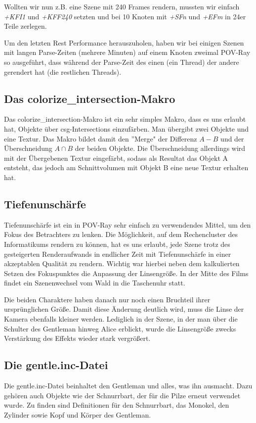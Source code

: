 \documentclass[twocolumn]{article}
\begin{document}
Wollten wir nun z.B. eine Szene mit 240 Frames rendern, mussten wir einfach \textit{+KFI1} und \textit{+KFF240} setzten und bei 10 Knoten mit \textit{+SFn} und \textit{+EFm} in 24er Teile zerlegen.
 

Um den letzten Rest Performance herauszuholen, haben wir bei einigen Szenen mit langen Parse-Zeiten (mehrere Minuten) auf einem Knoten zweimal POV-Ray so ausgeführt, dass während der Parse-Zeit des einen (ein Thread) der andere gerendert hat (die restlichen Threads).

\subsection{Das colorize\_intersection-Makro}
Das colorize\_intersection-Makro ist ein sehr simples Makro, dass es uns erlaubt hat, Objekte über csg-Intersections einzufärben.
Man übergibt zwei Objekte und eine Textur. Das Makro bildet damit den ''Merge" der Differenz $A - B$ und der Überschneidung $A \cap B$ der beiden Objekte.
Die Überschneidung allerdings wird mit der Übergebenen Textur eingefärbt, sodass als Resultat das Objekt A entsteht, das jedoch am Schnittvolumen mit Objekt B eine neue Textur erhalten hat.

\subsection{Tiefenunschärfe}
Tiefenunschärfe ist ein in POV-Ray sehr einfach zu verwendendes Mittel, um den Fokus des Betrachters zu lenken.
Die Möglichkeit, auf dem Rechencluster des Informatikums rendern zu können, hat es uns erlaubt, jede Szene trotz des gesteigerten Renderaufwands in endlicher Zeit mit Tiefenunschärfe in einer akzeptablen Qualität zu rendern.
Wichtig war hierbei neben dem kalkulierten Setzen des Fokuspunktes die Anpassung der Linsengröße.
In der Mitte des Films findet ein Szenenwechsel vom Wald in die Taschenuhr statt.

Die beiden Charaktere haben danach nur noch einen Bruchteil ihrer ursprünglichen Größe. Damit diese Änderung deutlich wird, muss die Linse der Kamera ebenfalls kleiner werden.
Lediglich in der Szene, in der man über die Schulter des Gentleman hinweg Alice erblickt, wurde die Linsengröße zwecks Verstärkung des Effekts wieder stark vergrößert.

\subsection{Die gentle.inc-Datei} %
Die gentle.inc-Datei beinhaltet den Gentleman und alles, was ihn ausmacht. Dazu gehören auch Objekte wie der Schnurrbart, der für die Pilze erneut verwendet wurde.
Zu finden sind Definitionen für den Schnurrbart, das Monokel, den Zylinder sowie Kopf und Körper des Gentleman.
\end{document}
